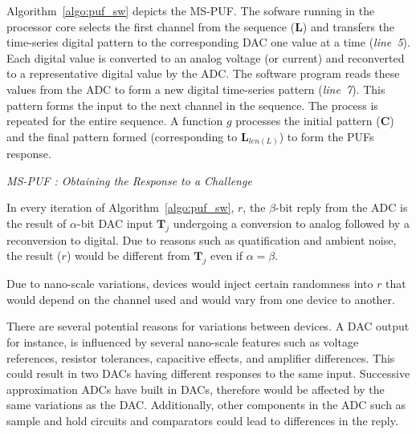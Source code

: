 Algorithm~\ref{algo:puf_sw} depicts the MS-PUF. 
The sofware running in the processor core 
selects the first channel from the sequence ($\mathbf L$) and 
transfers the time-series digital pattern to the corresponding
DAC one value at a time ({\em line~5}). Each digital value is converted to an analog voltage (or
current) and reconverted to a representative digital value by the ADC.
The software program reads these values from the ADC to form a new digital time-series 
pattern ({\em line~7}). This pattern forms the input to the next channel in the sequence. The process
is repeated for the entire sequence. A function $g$ processes the initial pattern ($\mathbf C$) and 
the final pattern formed (corresponding to $\mathbf L_{len(L)}$) to form the PUFs response.

\begin{algorithm}[!ht] \label{algo:puf_sw}
\begin{scriptsize}
	\caption{\emph{MS-PUF : Obtaining the Response to a Challenge}}
	\DontPrintSemicolon
 	\LinesNumbered
\end{scriptsize}
\end{algorithm}

In every iteration of Algorithm~\ref{algo:puf_sw}, $r$, the $\beta$-bit 
reply from the ADC is the result of $\alpha$-bit DAC input $\mathbf T_j$ 
undergoing a conversion to analog followed by a reconversion to digital. 
Due to reasons such as quatification and ambient noise, the result ($r$)
would be different from $\mathbf T_j$ even if $\alpha = \beta$. 

Due to nano-scale variations, devices would inject certain randomness into
$r$ that would depend on the channel used and would vary from one device to another. 




 
There are several potential reasons for variations 
between devices.
A DAC output for instance, is influenced by several nano-scale features such 
as voltage references, resistor tolerances, 
capacitive effects, and amplifier differences. This could result 
in two DACs having different responses to the same input. 
Successive approximation ADCs have built in DACs, therefore
would be affected by the same variations as the DAC. Additionally,
other components in the ADC such as sample and hold circuits and
comparators could lead to differences in the reply.







